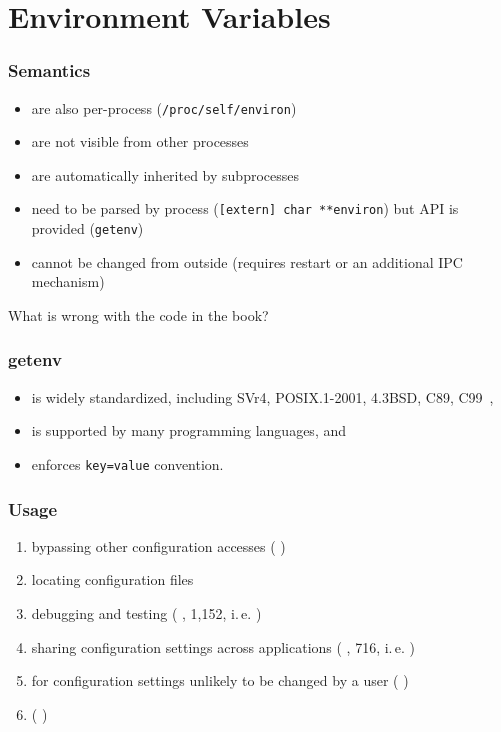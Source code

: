 \section{Environment Variables}

\begin{frame}
	\frametitle{Semantics}
	\begin{itemize}
	\item are also per-process (\texttt{/proc/self/environ})
	\item are not visible from other processes
	\item are automatically inherited by subprocesses
	\item need to be parsed by process (\texttt{[extern] char **environ}) but API is provided (\texttt{getenv})
	\item cannot be changed from outside (requires restart or an additional IPC mechanism)
	\end{itemize}
\end{frame}

\begin{assignment}
	\begin{task}
	What is wrong with the code in the book?
	\end{task}
\end{assignment}

\begin{frame}
	\frametitle{getenv}
	\begin{itemize}
	\item is widely standardized, including SVr4, POSIX.1-2001, 4.3BSD, C89, C99~\cite{man2017getenv},
	\item is supported by many programming languages, and
	\item enforces \texttt{key=value} convention.
	\end{itemize}
\end{frame}

\begin{frame}
	\frametitle{Usage}
	\begin{enumerate}
	\item bypassing other configuration accesses (\methodQuestion{} )
	\item locating configuration files
	\item debugging and testing (\methodQuestion{} , \methodSource{} 1,152, i.\,e. )
	\item sharing configuration settings across applications (\methodQuestion{} , \methodSource{} 716, i.\,e. )
	\item for configuration settings unlikely to be changed by a user (\methodQuestion{} )
	\item {} (\methodQuestion{} )
	\end{enumerate}
\end{frame}

